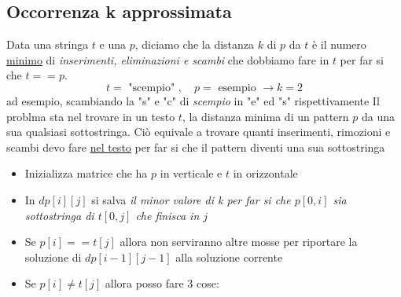 \subsection{Occorrenza k approssimata}
Data una stringa $ t $ e una $ p $, diciamo che la distanza $ k $ di $ p $ da $ t $ è il numero \underline{minimo} di \textit{inserimenti, eliminazioni e scambi} che dobbiamo fare in $ t $ per far si che $ t == p $.
\[
	t = \text{ "scempio" }, \quad p = \text{ esempio } \rightarrow k = 2
\]
ad esempio, scambiando la "s" e "c" di \textit{scempio} in "e" ed "s" rispettivamente
\vskip3mm
Il problma sta nel trovare in un testo $ t $, la distanza minima di un pattern $ p $ da una sua qualsiasi sottostringa.
\vskip3mm
Ciò equivale a trovare quanti inserimenti, rimozioni e scambi devo fare \underline{nel testo} per far si che il pattern diventi una sua sottostringa
\vskip3mm\vskip3mm
\begin{itemize}
	\item Inizializza matrice che ha $ p $ in verticale e $ t $ in orizzontale
	\item In $ dp\left[i\right]\left[j\right] $ si salva \textit{il minor valore di k per far si che $ p\left[0, i\right] $ sia sottostringa di $ t\left[0, j\right] $ che finisca in $ j $}
	\item Se $ p\left[i\right] == t\left[j\right] $ allora non serviranno altre mosse per riportare la soluzione di $ dp\left[i-1\right]\left[j-1\right] $ alla soluzione corrente
	\item Se $ p\left[i\right] \neq  t\left[j\right] $  allora posso fare 3 cose:
\end{itemize}

